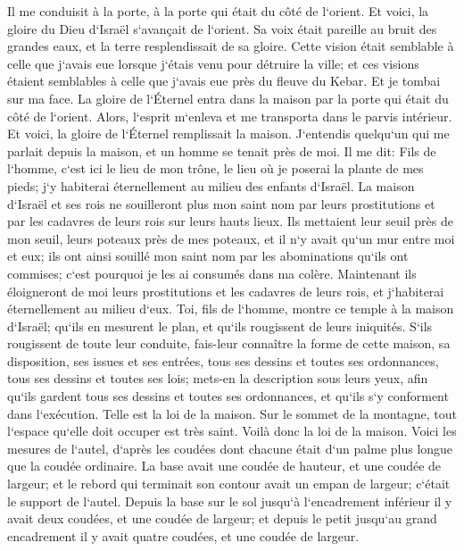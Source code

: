 \verse Il me conduisit à la porte, à la porte qui était du côté de l`orient. 
\verse Et voici, la gloire du Dieu d`Israël s`avançait de l`orient. Sa voix était pareille au bruit des grandes eaux, et la terre resplendissait de sa gloire. 
\verse Cette vision était semblable à celle que j`avais eue lorsque j`étais venu pour détruire la ville; et ces visions étaient semblables à celle que j`avais eue près du fleuve du Kebar. Et je tombai sur ma face. 
\verse La gloire de l`Éternel entra dans la maison par la porte qui était du côté de l`orient. 
\verse Alors, l`esprit m`enleva et me transporta dans le parvis intérieur. Et voici, la gloire de l`Éternel remplissait la maison. 
\verse J`entendis quelqu`un qui me parlait depuis la maison, et un homme se tenait près de moi. 
\verse Il me dit: Fils de l`homme, c`est ici le lieu de mon trône, le lieu où je poserai la plante de mes pieds; j`y habiterai éternellement au milieu des enfants d`Israël. La maison d`Israël et ses rois ne souilleront plus mon saint nom par leurs prostitutions et par les cadavres de leurs rois sur leurs hauts lieux. 
\verse Ils mettaient leur seuil près de mon seuil, leurs poteaux près de mes poteaux, et il n`y avait qu`un mur entre moi et eux; ils ont ainsi souillé mon saint nom par les abominations qu`ils ont commises; c`est pourquoi je les ai consumés dans ma colère. 
\verse Maintenant ils éloigneront de moi leurs prostitutions et les cadavres de leurs rois, et j`habiterai éternellement au milieu d`eux. 
\verse Toi, fils de l`homme, montre ce temple à la maison d`Israël; qu`ils en mesurent le plan, et qu`ils rougissent de leurs iniquités. 
\verse S`ils rougissent de toute leur conduite, fais-leur connaître la forme de cette maison, sa disposition, ses issues et ses entrées, tous ses dessins et toutes ses ordonnances, tous ses dessins et toutes ses lois; mets-en la description sous leurs yeux, afin qu`ils gardent tous ses dessins et toutes ses ordonnances, et qu`ils s`y conforment dans l`exécution. 
\verse Telle est la loi de la maison. Sur le sommet de la montagne, tout l`espace qu`elle doit occuper est très saint. Voilà donc la loi de la maison. 
\verse Voici les mesures de l`autel, d`après les coudées dont chacune était d`un palme plus longue que la coudée ordinaire. La base avait une coudée de hauteur, et une coudée de largeur; et le rebord qui terminait son contour avait un empan de largeur; c`était le support de l`autel. 
\verse Depuis la base sur le sol jusqu`à l`encadrement inférieur il y avait deux coudées, et une coudée de largeur; et depuis le petit jusqu`au grand encadrement il y avait quatre coudées, et une coudée de largeur. 

